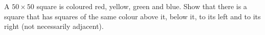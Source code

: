A $50 \times 50$ square is coloured red, yellow, green and blue. Show that there is a square that has squares of the same colour above it, below it, to its left and to its right (not necessarily adjacent).
